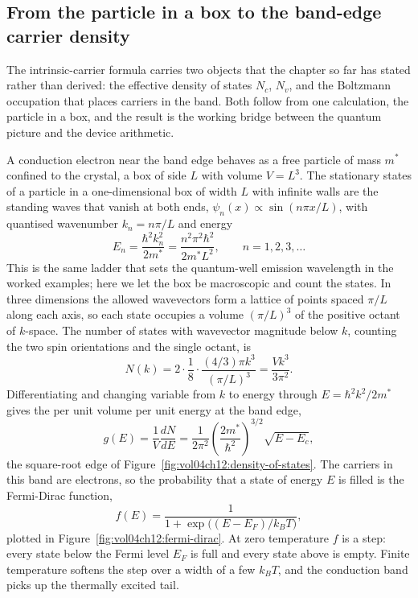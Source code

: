 \subsection{From the particle in a box to the band-edge carrier
density}

The intrinsic-carrier formula carries two objects that the chapter so
far has stated rather than derived: the effective density of states
$N_c$, $N_v$, and the Boltzmann occupation that places carriers in the
band. Both follow from one calculation, the particle in a box, and the
result is the working bridge between the quantum picture and the device
arithmetic.

A conduction electron near the band edge behaves as a free particle of
mass $m^{*}$ confined to the crystal, a box of side $L$ with volume
$V = L^{3}$. The stationary states of a particle in a one-dimensional
box of width $L$ with infinite walls are the standing waves that vanish
at both ends, $\psi_n(x) \propto \sin(n\pi x/L)$, with quantised
wavenumber $k_n = n\pi/L$ and energy
\[
E_n = \frac{\hbar^{2}k_n^{2}}{2m^{*}}
     = \frac{n^{2}\pi^{2}\hbar^{2}}{2m^{*}L^{2}},
\qquad n = 1, 2, 3, \dots
\]
This is the same ladder that sets the quantum-well emission wavelength
in the worked examples; here we let the box be macroscopic and count the
states. In three dimensions the allowed wavevectors form a lattice of
points spaced $\pi/L$ along each axis, so each state occupies a volume
$(\pi/L)^{3}$ of the positive octant of $k$-space. The number of states
with wavevector magnitude below $k$, counting the two spin orientations
and the single octant, is
\[
N(k) = 2 \cdot \frac{1}{8}\cdot\frac{(4/3)\pi k^{3}}{(\pi/L)^{3}}
     = \frac{V k^{3}}{3\pi^{2}}.
\]
Differentiating and changing variable from $k$ to energy through
$E = \hbar^{2}k^{2}/2m^{*}$ gives the  per
unit volume per unit energy at the band edge,
\[
g(E) = \frac{1}{V}\frac{dN}{dE}
     = \frac{1}{2\pi^{2}}\left(\frac{2m^{*}}{\hbar^{2}}\right)^{3/2}
       \sqrt{E - E_c},
\]
the square-root edge of Figure~\ref{fig:vol04ch12:density-of-states}.
The carriers in this band are electrons, so the probability that a state
of energy $E$ is filled is the Fermi-Dirac function,
\[
f(E) = \frac{1}{1 + \exp\!\big((E - E_F)/k_B T\big)},
\]
plotted in Figure~\ref{fig:vol04ch12:fermi-dirac}. At zero temperature
$f$ is a step: every state below the Fermi level $E_F$ is full and every
state above is empty. Finite temperature softens the step over a width
of a few $k_B T$, and the conduction band picks up the thermally excited
tail.

